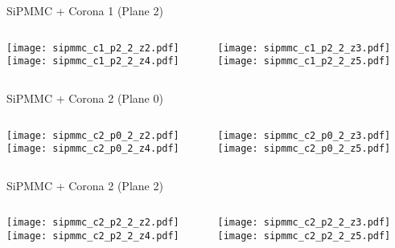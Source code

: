 \documentclass{beamer}
\begin{document}
\begin{frame}{SiPMMC + Corona 1 (Plane 2)}
	\begin{columns}[onlytextwidth]
		\begin{column}{0.5\textwidth}
			\texttt{[image: sipmmc\_c1\_p2\_2\_z2.pdf]} \\
			\texttt{[image: sipmmc\_c1\_p2\_2\_z4.pdf]}
		 \end{column}
		 \begin{column}{0.5\textwidth}
			\texttt{[image: sipmmc\_c1\_p2\_2\_z3.pdf]} \\
			\texttt{[image: sipmmc\_c1\_p2\_2\_z5.pdf]}
		 \end{column}
 \end{columns}
\end{frame}


\begin{frame}{SiPMMC + Corona 2 (Plane 0)}
	\begin{columns}[onlytextwidth]
		\begin{column}{0.5\textwidth}
			\texttt{[image: sipmmc\_c2\_p0\_2\_z2.pdf]} \\
			\texttt{[image: sipmmc\_c2\_p0\_2\_z4.pdf]}
		 \end{column}
		 \begin{column}{0.5\textwidth}
			\texttt{[image: sipmmc\_c2\_p0\_2\_z3.pdf]} \\
			\texttt{[image: sipmmc\_c2\_p0\_2\_z5.pdf]}
		 \end{column}
 \end{columns}
\end{frame}

\begin{frame}{SiPMMC + Corona 2 (Plane 2)}
	\begin{columns}[onlytextwidth]
		\begin{column}{0.5\textwidth}
			\texttt{[image: sipmmc\_c2\_p2\_2\_z2.pdf]} \\
			\texttt{[image: sipmmc\_c2\_p2\_2\_z4.pdf]}
		 \end{column}
		 \begin{column}{0.5\textwidth}
			\texttt{[image: sipmmc\_c2\_p2\_2\_z3.pdf]} \\
			\texttt{[image: sipmmc\_c2\_p2\_2\_z5.pdf]}
		 \end{column}
 \end{columns}
\end{frame}
\end{document}
